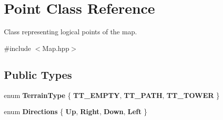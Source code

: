 \hypertarget{class_point}{}\section{Point Class Reference}
\label{class_point}


Class representing logical points of the map.  




{\ttfamily \#include $<$Map.\+hpp$>$}

\subsection*{Public Types}
\begin{DoxyCompactItemize}
\item 
\mbox{\label{class_point_a8a9b57f460ab0b37150d8de5fd7d6611}} 
enum {\bfseries Terrain\+Type} \{ {\bfseries T\+T\+\_\+\+E\+M\+P\+TY}, 
{\bfseries T\+T\+\_\+\+P\+A\+TH}, 
{\bfseries T\+T\+\_\+\+T\+O\+W\+ER}
 \}
\item 
\mbox{\label{class_point_a308add5f0fcae4c922a72852bf9fa733}} 
enum {\bfseries Directions} \{ {\bfseries Up}, 
{\bfseries Right}, 
{\bfseries Down}, 
{\bfseries Left}
 \}
\end{DoxyCompactItemize}
